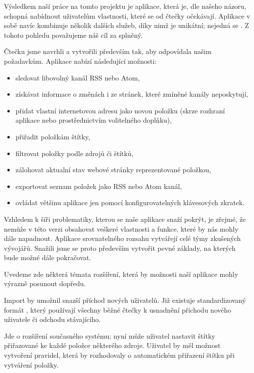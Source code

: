 
Výsledkem naší práce na tomto projektu je aplikace, která je, dle našeho názoru, schopná nabídnout uživatelům vlastnosti, které se od čtečky očekávají.
Aplikace v sobě navíc kombinuje několik dalších služeb, díky nimž je unikátní; nejedná se .
Z tohoto pohledu považujeme náš cíl za splněný.


Čtečku jsme navrhli a vytvořili především tak, aby odpovídala našim požadavkům.
Aplikace nabízí následující možnosti:
\begin{itemize}
	\item sledovat libovolný kanál RSS nebo Atom,
	\item získávat informace o změnách i ze stránek, které zmíněné kanály neposkytují,
	\item přidat vlastní internetovou adresu jako novou položku (skrze rozhraní aplikace nebo prostřednictvím volitelného doplňku),
	\item přiřadit položkám štítky,
	\item filtrovat položky podle zdrojů či štítků,
	\item zálohovat aktualní stav webové stránky reprezentované položkou,
	\item exportovat seznam položek jako RSS nebo Atom kanál,
	\item ovládat většinu aplikace jen pomocí konfigurovatelných klávesových zkratek.
\end{itemize}


Vzhledem k šíři problematiky, kterou se naše aplikace snaží pokrýt, je zřejmé, že nemůže v této verzi obsahovat veškeré vlastnosti a funkce, které by nás mohly dále napadnout.
Aplikace srovnatelného rozsahu vytvářejí celé týmy zkušených vývojářů.
Snažili jsme se proto především vytvořit pevné základy, na kterých bude možné dále pokračovat.

Uvedeme zde některá témata rozšíření, která by možnosti naší aplikace mohly výrazně posunout dopředu.

Import by umožnil snazší příchod nových uživatelů.
Již existuje standardizovaný formát , který používají všechny běžné čtečky k usnadnění příchodu nového uživatele či odchodu stávajícího.

Jde o rozšíření současného systému; nyní může uživatel nastavit štítky přiřazované ke každé položce některého zdroje.
Uživatel by měl možnost vytvoření pravidel, která by rozhodovaly o automatickém přiřazení štítku při vytváření položky.

